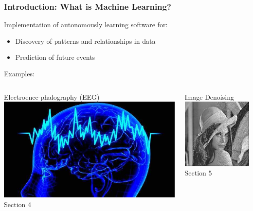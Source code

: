 \documentclass[10pt]{beamer}
\begin{document}
  \begin{frame}[t]\frametitle{Introduction: What is Machine Learning?}
	  	Implementation of autonomously learning software for:
        \begin{itemize}
        	\item Discovery of patterns and relationships in data
        	\item Prediction of future events
        \end{itemize}
        \vspace{5pt}
        \alert{Examples:}
        \begin{columns}
        	\begin{column}{.5\linewidth}
        		Electroence-phalography (EEG)\\
        		\includegraphics[width = 0.8\linewidth]{eeg_pic.jpg}\\
        		\alert{Section 4}
        	\end{column}\hspace{-10pt}
        	\begin{column}{.5\linewidth}
        		Image Denoising\\
        		\includegraphics[width = 0.8\linewidth]{lena_pic.jpg}\\
        		\alert{Section 5}
        	\end{column}
        \end{columns}
  \end{frame}
\end{document}

